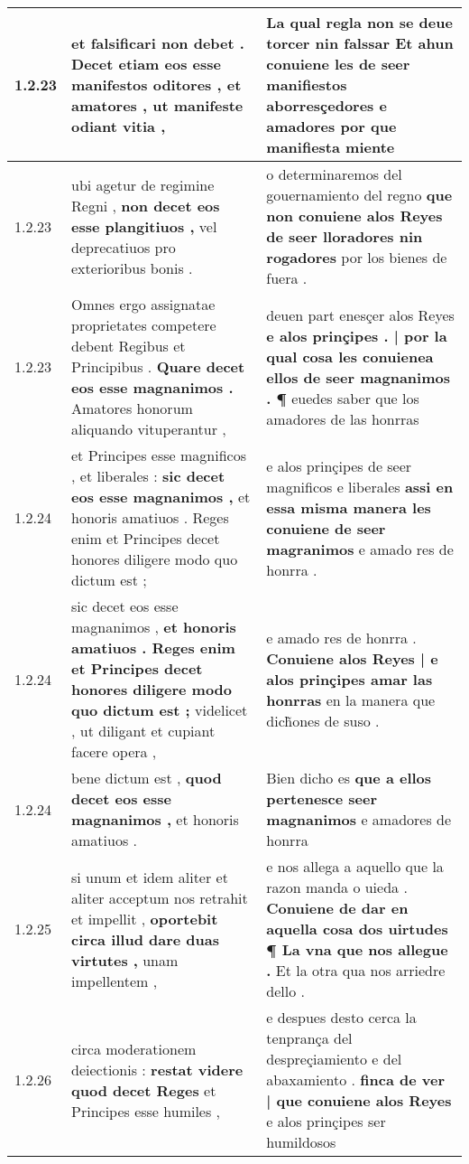 \begin{tabular}{|p{1cm}|p{6.5cm}|p{6.5cm}|}
1.2.23 & et falsificari non debet . \textbf{ Decet etiam eos esse manifestos oditores , et amatores , } ut manifeste odiant vitia , & La qual regla non se deue torcer nin falssar \textbf{ Et ahun conuiene les de seer manifiestos aborresçedores e amadores } por que manifiesta miente \\\hline
1.2.23 & ubi agetur de regimine Regni , \textbf{ non decet eos esse plangitiuos , } vel deprecatiuos pro exterioribus bonis . & o determinaremos del gouernamiento del regno \textbf{ que non conuiene alos Reyes de seer lloradores nin rogadores } por los bienes de fuera . \\\hline
1.2.23 & Omnes ergo assignatae proprietates competere debent Regibus et Principibus . \textbf{ Quare decet eos esse magnanimos . } Amatores honorum aliquando vituperantur , & deuen part enesçer alos Reyes \textbf{ e alos prinçipes . | por la qual cosa les conuienea ellos de seer magnanimos . ¶ } euedes saber que los amadores de las honrras \\\hline
1.2.24 & et Principes esse magnificos , et liberales : \textbf{ sic decet eos esse magnanimos , } et honoris amatiuos . Reges enim et Principes decet honores diligere modo quo dictum est ; & e alos prinçipes de seer magnificos e liberales \textbf{ assi en essa misma manera les conuiene de seer magranimos } e amado res de honrra . \\\hline
1.2.24 & sic decet eos esse magnanimos , \textbf{ et honoris amatiuos . Reges enim et Principes decet honores diligere modo quo dictum est ; } videlicet , ut diligant et cupiant facere opera , & e amado res de honrra . \textbf{ Conuiene alos Reyes | e alos prinçipes amar las honrras } en la manera que dich̃ones de suso . \\\hline
1.2.24 & bene dictum est , \textbf{ quod decet eos esse magnanimos , } et honoris amatiuos . & Bien dicho es \textbf{ que a ellos pertenesce seer magnanimos } e amadores de honrra \\\hline
1.2.25 & si unum et idem aliter et aliter acceptum nos retrahit et impellit , \textbf{ oportebit circa illud dare duas virtutes , } unam impellentem , & e nos allega a aquello que la razon manda o uieda . \textbf{ Conuiene de dar en aquella cosa dos uirtudes ¶ La vna que nos allegue . } Et la otra qua nos arriedre dello . \\\hline
1.2.26 & circa moderationem deiectionis : \textbf{ restat videre quod decet Reges } et Principes esse humiles , & e despues desto cerca la tenprança del despreçiamiento e del abaxamiento . \textbf{ finca de ver | que conuiene alos Reyes } e alos prinçipes ser humildosos \\\hline

\end{tabular}
